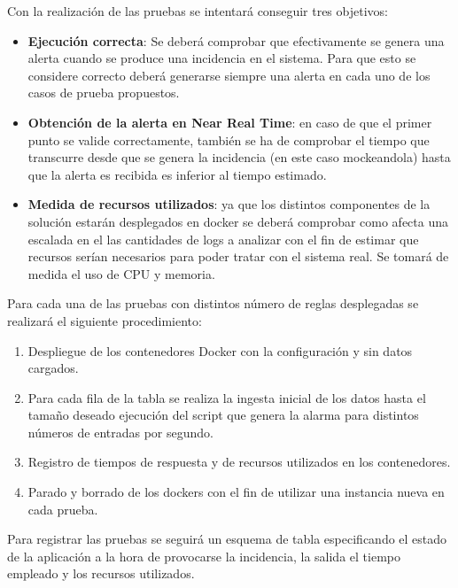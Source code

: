 Con la realización de las pruebas se intentará conseguir tres objetivos:

\begin{itemize}


	\item \textbf{Ejecución correcta}: Se deberá comprobar que efectivamente se genera una alerta cuando se produce una incidencia en el sistema. Para que esto se considere correcto deberá generarse siempre una alerta en cada uno de los casos de prueba propuestos.

	\item \textbf{Obtención de la alerta en Near Real Time}: en caso de que el primer punto se valide correctamente, también se ha de comprobar el tiempo que transcurre desde que se genera la incidencia (en este caso mockeandola) hasta que la alerta es recibida es inferior al tiempo estimado.

	\item \textbf{Medida de recursos utilizados}: ya que los distintos componentes de la solución estarán desplegados en docker se deberá comprobar como afecta una escalada en el las cantidades de logs a analizar con el fin de estimar que recursos serían necesarios para poder tratar con el sistema real. Se tomará de medida el uso de CPU y memoria.

\end{itemize}

Para cada una de las pruebas con distintos número de reglas desplegadas se realizará el siguiente procedimiento:

\begin{enumerate}
	\item Despliegue de los contenedores Docker con la configuración y sin datos cargados.
	\item Para cada fila de la tabla se realiza la ingesta inicial de los datos   hasta el tamaño deseado ejecución del script que genera la alarma para distintos números de entradas por segundo.
	\item Registro de tiempos de respuesta y de recursos utilizados en los contenedores.
	\item Parado y borrado de los dockers con el fin de utilizar una instancia nueva en cada prueba.
\end{enumerate}

Para registrar las pruebas se seguirá un esquema de tabla especificando el estado de la aplicación a la hora de provocarse  la incidencia, la salida el tiempo empleado y los recursos utilizados.

